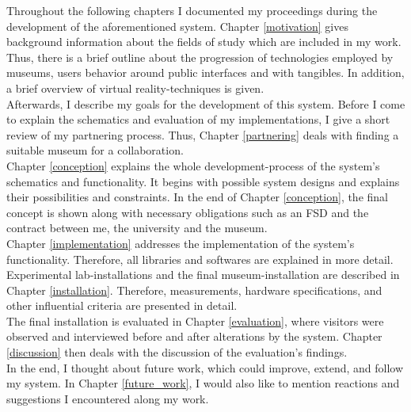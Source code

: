 

Throughout the following chapters I documented my proceedings during the development of the aforementioned system. Chapter \ref{motivation} gives background information about the fields of study which are included in my work. Thus, there is a brief outline about the progression of technologies employed by museums, users behavior around public interfaces and with tangibles. In addition, a brief overview of virtual reality-techniques is given.
\\
Afterwards, I describe my goals for the development of this system. Before I come to explain the schematics and evaluation of my implementations, I give a short review of my partnering process. Thus, Chapter \ref{partnering} deals with finding a suitable museum for a collaboration. 
\\
Chapter \ref{conception} explains the whole development-process of the system's schematics and functionality. It begins with possible system designs and explains their possibilities and constraints. In the end of Chapter \ref{conception}, the final concept is shown along with necessary obligations such as an \ac{FSD} and the contract between me, the university and the museum.
\\
Chapter \ref{implementation} addresses the implementation of the system's functionality. Therefore, all libraries and softwares are explained in more detail.
\\
Experimental lab-installations and the final museum-installation are described in Chapter \ref{installation}. Therefore, measurements, hardware specifications, and other influential criteria are presented in detail.
\\
The final installation is evaluated in Chapter \ref{evaluation}, where visitors were observed and interviewed before and after alterations by the system. Chapter \ref{discussion} then deals with the discussion of the evaluation's findings.
\\
In the end, I thought about future work, which could improve, extend, and follow my system. In Chapter \ref{future_work}, I would also like to mention reactions and suggestions I encountered along my work.

